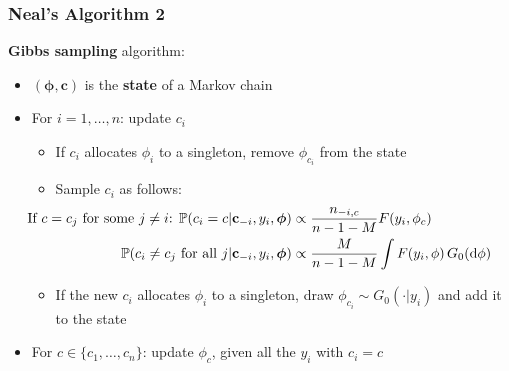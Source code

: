 \begin{frame} %
	\frametitle{Neal's Algorithm 2}
	\textbf{Gibbs sampling} algorithm:
	\begin{itemize}
		\item $(\boldsymbol\phi, \mathbf c)$ is the \textbf{state} of a Markov chain
	    \item For $i= 1,\dots,n$: update $c_{i}$
	    \begin{itemize}
	        \item If $c_{i}$ allocates $\phi_i$ to a singleton, remove $\phi_{c_{i}}$ from the state
		    \item Sample $c_i$ as follows:
	        \begin{align*}
		        \hspace{-35pt}
                \text{If $c=c_j$ for some $j\neq i$: } \PP(c_{i}=c | \mathbf c_{-i}, y_{i},\boldsymbol\phi) &\propto \frac{n_{-i,c}}{n-1-M} F(y_{i},\phi_{c}) \\
                \PP(c_{i}\neq c_{j} \text{ for all } j | \mathbf c_{-i}, y_{i},\boldsymbol\phi) &\propto \frac{M }{n-1-M} \int F(y_{i},\phi) \, G_0(\de\phi)
            \end{align*}
            \item If the new $c_{i}$ allocates $\phi_i$ to a singleton, draw $\phi_{c_{i}} \sim G_0(\cdot|y_i)$ and add it to the state
        \end{itemize} 
        
       	\item For $c \in \{c_{1},\dots,c_{n}\}$: update $\phi_{c}$, given all the $y_{i}$ with $c_{i}=c$
	\end{itemize}
		
\end{frame}




